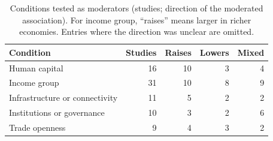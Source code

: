 \begin{table}[ht]\centering\small
\caption{Conditions tested as moderators (studies; direction of the moderated association). For income group, ``raises'' means larger in richer economies. Entries where the direction was unclear are omitted.}\label{tab:conditions}
\begin{tabular}{@{}lrrrr@{}}\toprule Condition & Studies & Raises & Lowers & Mixed\\\midrule
Human capital & 16 & 10 & 3 & 4\\
Income group & 31 & 10 & 8 & 9\\
Infrastructure or connectivity & 11 & 5 & 2 & 2\\
Institutions or governance & 10 & 3 & 2 & 6\\
Trade openness & 9 & 4 & 3 & 2\\
\bottomrule\end{tabular}\end{table}
